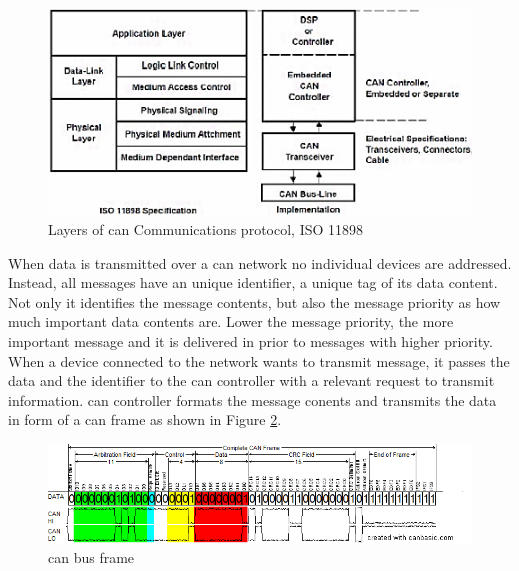 \begin{figure}[H]
\begin{center}
\captionsetup{font=small}
\includegraphics[scale=0.5]{pics/iso_osi_can.png}
\caption{Layers of \gls{can} Communications protocol, ISO 11898}
\label{fig:iso_osi_can}
\end{center}
\end{figure}
When data is transmitted over a \gls{can} network no individual devices are addressed. Instead, all messages have an unique identifier, a unique tag of its data content. Not only it identifies the message contents, but also the message priority as how much important data contents are. Lower the message priority, the more important message and it is delivered in prior to messages with higher priority. When a device connected to the network wants to transmit message, it passes the data and the identifier to the \gls{can} controller with a relevant request to transmit information. \gls{can} controller formats the message conents and transmits the data in form of a \gls{can} frame as shown in Figure \ref{fig:can_bus_frame}.
\begin{figure}[H]
\begin{center}
\captionsetup{font=small}
\includegraphics[scale=0.55]{pics/can_bus_frame.png}
\caption{\gls{can} bus frame \cite{can_frame_pic}}
\label{fig:can_bus_frame}
\end{center}
\end{figure}
